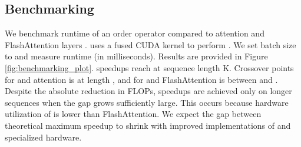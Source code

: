\subsection{Benchmarking}
We benchmark runtime of an order   operator compared to attention and FlashAttention layers \citep{dao2022flashattention}.  uses a fused CUDA kernel to perform  \citep{dao2022hungry}. We set batch size to  and measure runtime (in milliseconds). Results are provided in Figure \ref{fig:benchmarking_plot}.  speedups reach  at sequence length K. Crossover points for  and attention is at length , and for  and FlashAttention is between  and . Despite the absolute reduction in FLOPs, speedups are achieved only on longer sequences when the gap grows sufficiently large. This occurs because hardware utilization of  is lower than FlashAttention. We expect the gap between theoretical maximum speedup to shrink with improved implementations of  and specialized hardware.
